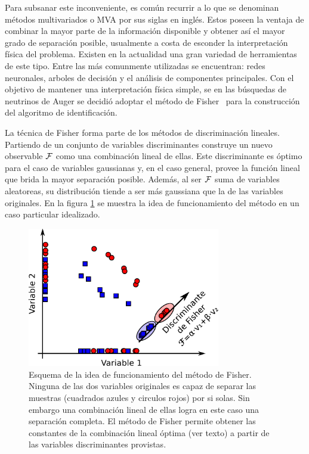 	Para subsanar este inconveniente, es común recurrir a lo que se denominan métodos multivariados o MVA por sus siglas en inglés.
	Estos poseen la ventaja de combinar la mayor parte de la información disponible y obtener así el mayor grado de separación posible, usualmente a costa de esconder la interpretación física del problema.
	Existen en la actualidad una gran variedad de herramientas de este tipo. Entre las más comunmente utilizadas se encuentran: redes neuronales, arboles de decisión y el análisis de componentes principales. 
	Con el objetivo de mantener una interpretación física simple, se en las búsquedas de neutrinos de Auger se decidió adoptar el método de Fisher~\cite{cite:Fisher} para la construcción del algoritmo de identificación.

	La técnica de Fisher forma parte de los métodos de discriminación lineales.
	Partiendo de un conjunto de variables discriminantes construye un nuevo observable ${\cal F}$ como una combinación lineal de ellas.
	Este discriminante es óptimo para el caso de variables gaussianas y, en el caso general, provee la función lineal que brida la mayor separación posible.
	Además, al ser ${\cal F}$ suma de variables aleatoreas, su distribución tiende a ser más gaussiana que la de las variables originales.
	En la figura \ref{fig:ideaFisher} se muestra la idea de funcionamiento del método en un caso particular idealizado.
	\begin{figure}[ht]
	\begin{center}
	\includegraphics[width=0.75\textwidth]{fig/seleccionAuger/ideaFisher}
	\caption{Esquema de la idea de funcionamiento del método de Fisher. Ninguna de las dos variables originales es capaz de separar las muestras (cuadrados azules y circulos rojos) por si solas. Sin embargo una combinación lineal de ellas logra en este caso una separación completa. El método de Fisher permite obtener las constantes de la combinación lineal óptima (ver texto) a partir de las variables discriminantes provistas.}
	\label{fig:ideaFisher}
	\end{center}
	\end{figure}


